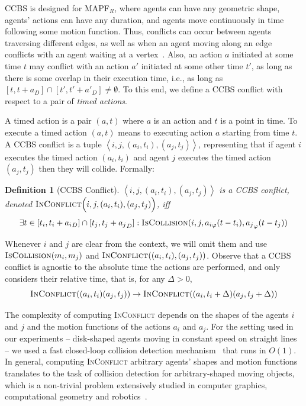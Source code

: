 \documentclass[review]{elsarticle}
\newtheorem{definition}{Definition}
\newcommand{\tuple}[1]{\ensuremath{\left \langle #1 \right \rangle }}
\newcommand\konstantin[1]{\nb{\textbf{Konstantin:}}{red}{#1}}
\newcommand\roni[1]{\nb{\textbf{Roni:}}{green}{#1}}
\newcommand{\ccbs}{\ac{CCBS}\xspace}
\newcommand{\mapfr}{\ac{MAPF}$_R$\xspace}
\newcommand{\iscollision}{\textsc{IsCollision}\xspace}
\newcommand{\inconflict}{\textsc{InConflict}\xspace}
\begin{document}
\ccbs is designed for \mapfr, where agents can have any geometric shape, agents' actions can have any duration, and agents move continuously in time following some motion function.
Thus, conflicts can occur between agents traversing different edges, as well as when an agent moving along an edge conflicts with an agent waiting at a vertex~\cite{li2019multi}. Also, an action $a$ initiated at some time $t$ may conflict with an action $a'$ initiated at some other time $t'$, as long as there is some overlap in their execution time, i.e., as long as 
$[t,t+a_D]\cap [t',t'+a'_D]\neq\emptyset$. To this end, we define a \ccbs conflict with respect to a pair of \emph{timed actions}.

A timed action is a pair $(a,t)$ where $a$ is an action and $t$ is a point in time. 
To execute a timed action $(a,t)$ means to executing action $a$ starting from time $t$. 
A \ccbs conflict is a tuple $\tuple{i,j, (a_i, t_i), (a_j, t_j)}$, representing that if agent $i$ executes the timed action $(a_i,t_i)$ and agent $j$ executes the timed action $(a_j,t_j)$ then they will collide. Formally:
\begin{definition}[\ccbs Conflict]
$\tuple{i,j, (a_i, t_i), (a_j, t_j)}$ is a \ccbs conflict, denoted 
$\inconflict \Big(i,j, (a_i,t_i), (a_j,t_j)\Big)$,
iff 
\begin{equation}
\exists t\in [t_i,t_i+{a_i}_D]\cap [t_j,t_j+{a_j}_D]: 
    \iscollision(i,j,{a_i}_\varphi(t-t_i), 
                        {a_j}_\varphi(t-t_j))
\label{eq:inconflict}
\end{equation}
\label{def:ccbs-conflict}
\end{definition}
Whenever $i$ and $j$ are clear from the context, we will omit them and use $\iscollision(m_i,m_j)$ and $\inconflict((a_i,t_i), (a_j,t_j))$. 
Observe that 
a \ccbs conflict is agnostic to the absolute time the actions are performed, and only considers their relative time, that is, for any $\Delta>0$, 
\begin{equation}
    \inconflict((a_i,t_i)(a_j,t_j))\rightarrow
    \inconflict((a_i,t_i+\Delta)(a_j,t_j+\Delta))
    \label{eq:delta-invariance}
\end{equation}


The complexity of computing \inconflict depends on the shapes of the agents $i$ and $j$ and the motion functions of the actions $a_i$ and $a_j$. For the setting used in our experiments -- disk-shaped agents moving in constant speed on straight lines -- we used a fast closed-loop collision detection mechanism~\cite{guy2015} that runs in $O(1)$. 
In general, computing \inconflict arbitrary agents' shapes and motion functions translates to the task of collision detection for arbitrary-shaped moving objects, which is a non-trivial problem extensively studied in computer graphics, computational geometry and robotics~\cite{jimenez20013d}. 
\end{document}
